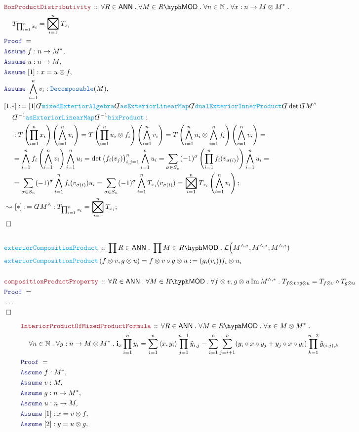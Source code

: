 \documentclass[12pt]{scrartcl}%
\newcommand{\TYPE}[1]{\textcolor{NavyBlue}{\mathtt{#1}}}%
\newcommand{\FUNC}[1]{\textcolor{Cerulean}{\mathtt{#1}}}%
\newcommand{\LOGIC}[1]{\textcolor{Blue}{\mathtt{#1}}}%
\newcommand{\THM}[1]{\textcolor{Maroon}{\mathtt{#1}}}%
\renewcommand{\.}{\; . \;} %
\newcommand{\de}{: \kern 0.1pc =} %
\newcommand{\Act}[1]{\left( #1 \right)} %
\newcommand{\Theorem}[2]{& \THM{#1} \, :: \, #2 \\ & \Proof = \\ } %
\newcommand{\DeclareFunc}[2]{& \FUNC{#1} \, :: \, #2 \\}%
\newcommand{\DefineNamedFunc}[4]{&  \FUNC{#1}\Act{#2} = #3 \de #4 \\}%
\newcommand{\NewLine}{\\ & \kern 1pc}%
\newcommand{\Page}[1]{ \begin{align*} #1 \end{align*}  }%
\newcommand{ \bd }{ \ByDef }%
\newcommand{\NoProof}{ & \ldots \\ \EndProof}%
\newcommand{\Nat}{\mathbb{N}}%
\DeclareMathOperator*{\im}{Im}%
\newcommand{\Conclude}[3]{& #1 \de #2 : #3; \\}%
\newcommand{\DeriveConclude}[3]{& \leadsto #1 \de #2 : #3 ; \\} %
\newcommand{\Assume}[2]{& \LOGIC{Assume} \; #1 : #2, \\} %
\newcommand{\QED}{\; \square} %
\newcommand{\EndProof}{& \QED \\} %
\newcommand{\ByDef}{\rotatebox[origin=c]{-180}{$D$}}%
\newcommand{\Proof}{\LOGIC{Proof} \; } %
\DeclareMathOperator{\bigboxtimes}{\scalerel*{\boxtimes}{\sum}} %
\newcommand{\LMOD}[1]{#1\hyph\mathsf{MOD}} %
\renewcommand{\L}{\mathcal{L}}
\newcommand{\ANN}{\mathsf{ANN}} %
\begin{document}
\Page{
	\Theorem{BoxProductDistributivity}
	{
		\forall R \in \ANN \.
		\forall M \in \LMOD{R} \.
		\forall n \in \Nat \.
		\forall x : n \to M \otimes M^{*} \.
		\NewLine 
		T_{\prod^n_{i=1}x_i} = \bigboxtimes^n_{i=1} T_{x_i}
	}
	\Assume{f}{n \to M^*}
	\Assume{u}{n \to M}
	\Assume{[1]}{x = u \otimes f}
	\Assume{\bigwedge^n_{i=1} v_i}{\TYPE{Decomposable}(M)}
	\Conclude{[1.*]}{  
		[1]
		\bd \FUNC{mixedExteriorAlgebra}
		\bd \FUNC{asExteriorLinearMap}  
		\bd \FUNC{dualExteriorInnerProduct}
		\bd \det
		\bd M^\wedge \NewLine 
		\bd^{-1} \FUNC{asExteriorLinearMap}
		\bd^{-1} \FUNC{bixProduct}
	}
	{
		\NewLine : 
		T\Act{\prod^n_{i=1}x_i}\Act{\bigwedge^n_{i=1} v_i} =
		T\Act{\prod^n_{i=1}u_i \otimes f_i} \Act{ \bigwedge^n_{i=1}v_i }  =
		T\Act{\bigwedge^n_{i=1} u_i \otimes \bigwedge^n_{i=1} f_i }\Act{\bigwedge^n_{i=1} v_i} = \NewLine = 
		\bigwedge^n_{i=1} f_i  \Act{\bigwedge^n_{i=1} v_i} \bigwedge^n_{i=1} u_i  = 
		\det \big( f_i(v_j)  \big)^n_{i,j=1} \bigwedge^n_{i=1} u_i = 
		\sum_{\sigma \in S_n} (-1)^\sigma \Act{\prod^n_{i=1} f_i(v_{\sigma(i)})} \bigwedge^n_{i=1} u_i  = \NewLine =  
		\sum_{\sigma \in S_n} (-1)^\sigma  \bigwedge^n_{i=1} f_i(v_{\sigma(i)}) u_i =  
		\sum_{\sigma \in S_n} (-1)^\sigma \bigwedge^n_{i=1} T_{x_i}(v_{\sigma(i)})   =
		\bigboxtimes^n_{i=1} T_{x_i} \Act{\bigwedge^n_{i=1} v_i } 
	}
	\DeriveConclude{[*]}{\bd M^\wedge}{ T_{\prod^n_{i=1} x_i} = \bigboxtimes^n_{i=1} T_{x_i}}
	\EndProof
	\\
	\DeclareFunc{exteriorCompositionProduct}
	{
		\prod R \in \ANN \. 
		\prod M \in \LMOD{R} \.
		\L\Big(M^{\wedge,*},M^{\wedge,*};M^{\wedge,*})
	}
	\DefineNamedFunc{exteriorCompositionProduct}
	{ f \otimes v, g \otimes u  }{f \otimes v \circ g \otimes u}{  (g_i(v_i)) f_i \otimes u_i}
	\\
	\Theorem{compositionProductProperty}
	{
		\forall R \in \ANN \.
		\forall M \in \LMOD{R} \.
		\forall f \otimes v, g \otimes u \im M^{\wedge,*} \.
		T_{f \otimes v \circ g \otimes u} = T_{f \otimes v} \circ T_{g \otimes u}
	}
	\NoProof
}\Page{
	\Theorem{InteriorProductOfMixedProductFormula}{
		\forall R \in \ANN \. 
		\forall M \in \LMOD{R} \.
		\forall x \in M \otimes M^* \. \NewLine 
		\forall n \in \Nat \.
		\forall y : n \to M \otimes M^* \.
		\mathbf{i}_{x} \prod^n_{i=1} y_i  =
		\sum^n_{i=1}  {\langle x, y_i \rangle} \prod^{n-1}_{j=1} \hat{y}_{i,j} -
		\sum^n_{i=1} \sum^n_{j=i+1} ( y_i \circ x \circ y_j + y_j \circ x \circ y_i) \prod^{n-2}_{k=1} \hat y_{(i,j),k}
	}
	\Assume{f}{M^*}
	\Assume{v}{M}
	\Assume{g}{n \to M^*}
	\Assume{u}{n \to M}
	\Assume{[1]}{ x =v \otimes f}
	\Assume{[2]}{ y = u \otimes g}
}
\end{document}

